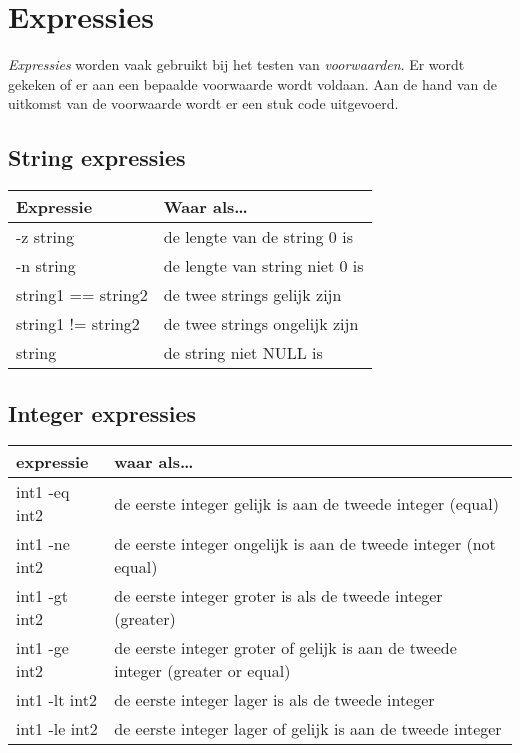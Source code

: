 \section{Expressies}
\emph{Expressies} worden vaak gebruikt bij het testen van \emph{voorwaarden}. Er wordt gekeken of er aan een bepaalde voorwaarde wordt voldaan. Aan de hand van de uitkomst van de voorwaarde wordt er een stuk code uitgevoerd.

\subsection{String expressies}
\begin{tabular}[t]{ll}
  Expressie & Waar als\ldots \\
  \hline
  -z string & de lengte van de string 0 is \\
  -n string & de lengte van string niet 0 is\\
  string1 == string2 & de twee strings gelijk zijn\\
  string1 != string2 & de twee strings ongelijk zijn\\
  string & de string niet NULL is\\
\end{tabular}

\subsection{Integer expressies}
\begin{tabular}[t]{ll}
  expressie & waar als\ldots \\
  \hline
  int1 -eq int2 & de eerste integer gelijk is aan de tweede integer (equal)\\
  int1 -ne int2 & de eerste integer ongelijk is aan de tweede integer (not equal)\\
  int1 -gt int2 & de eerste integer groter is als de tweede integer (greater) \\
  int1 -ge int2 & de eerste integer groter of gelijk is aan de tweede integer (greater or equal) \\
  int1 -lt int2 & de eerste integer lager is als de tweede integer \\
  int1 -le int2 & de eerste integer lager of gelijk is aan de tweede integer \\
\end{tabular}

